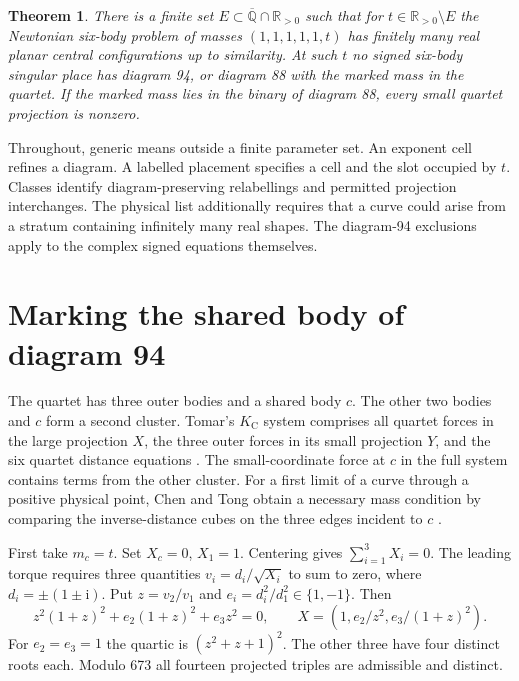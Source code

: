 \documentclass[11pt]{article}
\newtheorem{theorem}{Theorem}
\newcommand{\KC}{K_{\mathrm C}}
\begin{document}
\begin{theorem}\label{main}
There is a finite set $E\subset\overline{\mathbb Q}\cap\mathbb R_{>0}$ such that for $t\in\mathbb R_{>0}\setminus E$ the Newtonian six-body problem of masses $(1,1,1,1,1,t)$ has finitely many real planar central configurations up to similarity. At such $t$ no signed six-body singular place has diagram 94, or diagram 88 with the marked mass in the quartet. If the marked mass lies in the binary of diagram 88, every small quartet projection is nonzero.
\end{theorem}
Throughout, generic means outside a finite parameter set. An exponent cell refines a diagram. A labelled placement specifies a cell and the slot occupied by $t$. Classes identify diagram-preserving relabellings and permitted projection interchanges. The physical list additionally requires that a curve could arise from a stratum containing infinitely many real shapes. The diagram-94 exclusions apply to the complex signed equations themselves.

\section{Marking the shared body of diagram 94}
The quartet has three outer bodies and a shared body $c$. The other two bodies and $c$ form a second cluster. Tomar's $\KC$ system comprises all quartet forces in the large projection $X$, the three outer forces in its small projection $Y$, and the six quartet distance equations \cite[Lemma 6.16]{Tomar}. The small-coordinate force at $c$ in the full system contains terms from the other cluster. For a first limit of a curve through a positive physical point, Chen and Tong obtain a necessary mass condition by comparing the inverse-distance cubes on the three edges incident to $c$ \cite[Prop.~5.20]{CT}.

First take $m_c=t$. Set $X_c=0$, $X_1=1$. Centering gives $\sum_{i=1}^3 X_i=0$. The leading torque requires three quantities $v_i=d_i/\sqrt{X_i}$ to sum to zero, where $d_i=\pm(1\pm\mathrm i)$. Put $z=v_2/v_1$ and $e_i=d_i^2/d_1^2\in\{1,-1\}$. Then
\begin{equation}\label{quartic}
 z^2(1+z)^2+e_2(1+z)^2+e_3z^2=0,\qquad
 X=(1,e_2/z^2,e_3/(1+z)^2).
\end{equation}
For $e_2=e_3=1$ the quartic is $(z^2+z+1)^2$. The other three have four distinct roots each. Modulo 673 all fourteen projected triples are admissible and distinct.
\end{document}
